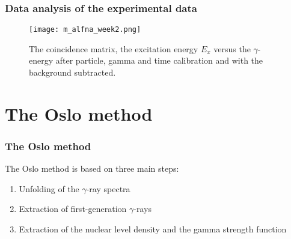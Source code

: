 \documentclass{beamer}              %
\begin{document}
\begin{frame}
\frametitle{Data analysis of the experimental data}
\begin{figure}[h!]
\centering
\texttt{[image: m\_alfna\_week2.png]}
\caption{The coincidence matrix, the excitation energy $E_x$ versus the $\gamma$-energy after particle, gamma and time calibration and with the background subtracted. }
\label{fig: coincidence}
\end{figure}
\end{frame}

\section{The Oslo method}
\begin{frame}
\frametitle{The Oslo method}
The Oslo method is based on three main steps:
\begin{enumerate}
\item Unfolding of the $\gamma$-ray spectra
\item Extraction of first-generation $\gamma$-rays
\item Extraction of the nuclear level density and the gamma strength function
\end{enumerate}
\begin{figure}
\end{figure}
\end{frame}
\end{document}

